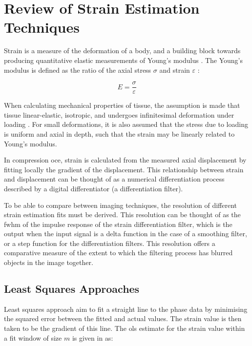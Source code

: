 \chapter{Review of Strain Estimation Techniques}\label{review}

Strain is a measure of the deformation of a body, and a building block towards producing quantitative elastic measurements of Young's modulus \cite{wang_optical_2015}. The Young's modulus is defined as the ratio of the axial stress $\sigma$ and strain $\varepsilon$ \cite{kennedy_review_2014}:

\begin{equation}
	E = \frac{\sigma}{\varepsilon}
	\label{youngs_modulus}
\end{equation}

When calculating mechanical properties of tissue, the assumption is made that tissue linear-elastic, isotropic, and undergoes infinitesimal deformation under loading \cite{kennedy_review_2014}. For small deformations, it is also assumed that the stress due to loading is uniform and axial in depth, such that the strain may be linearly related to Young's modulus.

In compression \ac{oce}, strain is calculated from the measured axial displacement by fitting locally the gradient of the displacement. This relationship between strain and displacement can be thought of as a numerical differentiation process \cite{luo_axial_2004} described by a digital differentiator (a differentiation filter).

To be able to compare between imaging techniques, the resolution of different strain estimation fits must be derived. This resolution can be thought of as the \ac{fwhm} of the impulse response of the strain differentiation filter, which is the output when the input signal is a delta function in the case of a smoothing filter, or a step function for the differentiation filters. This resolution offers a comparative measure of the extent to which the filtering process has blurred objects in the image together. 

\section{Least Squares Approaches}\label{least_squares}
Least squares approach aim to fit a straight line to the phase data by minimising the squared error between the fitted and actual values. The strain value is then taken to be the gradient of this line. The \ac{ols} estimate for the strain value within a fit window of size $m$ is given in \cite{kennedy_strain_2012} as:

